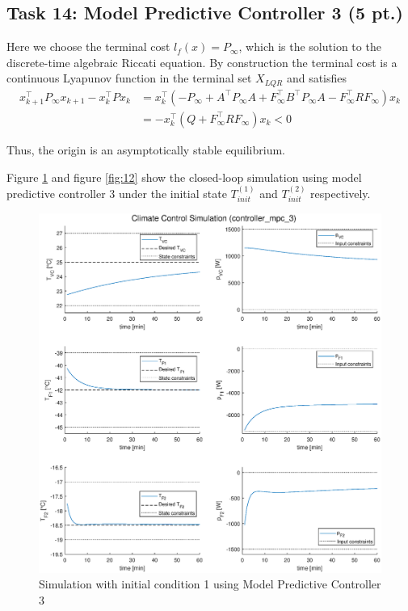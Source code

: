 \documentclass[a4paper,twoside,11pt]{article}
\numberwithin{equation}{section}
\begin{document}
\subsection{Task 14: Model Predictive Controller 3 (5 pt.)}

Here we choose the terminal cost $l_f(x) = P_\infty$, which is the solution to the discrete-time algebraic Riccati equation. By construction the terminal cost is a continuous Lyapunov function in the terminal set $X_{LQR}$ and satisfies
\begin{equation*}
    \begin{split}
        x^\top_{k+1} P_\infty x_{k+1}-x^\top_k P x_k &= x^\top_k(-P_\infty + A^\top P_\infty A + F_\infty^\top B^\top P_\infty A - F^\top_\infty R F_\infty)x_k \\
        &= -x^\top_k(Q + F^\top_\infty R F_\infty)x_k < 0
    \end{split}
\end{equation*}

Thus, the origin is an asymptotically stable equilibrium. 

Figure \ref{fig:11} and figure \ref{fig:12} show the closed-loop simulation using model predictive controller 3 under the initial state $T^{(1)}_{init}$ and $T^{(2)}_{init}$ respectively. 

\newpage

\begin{figure}[ht]
\centering
\includegraphics[scale = 0.58]{image/14-1.eps}
\caption{Simulation with initial condition 1 using Model Predictive Controller 3}
\label{fig:11}
\end{figure}
\end{document}
